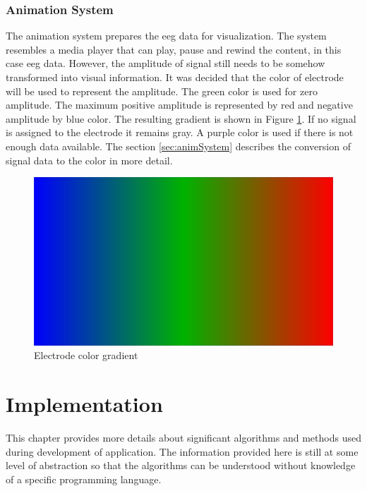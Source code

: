 \subsection{Animation System}
\label{ssec:concAnimSystem}
The animation system prepares the \gls{eeg} data for visualization. The system resembles a media player that can play, pause and rewind the content, in this case \gls{eeg} data. However, the amplitude of signal still needs to be somehow transformed into visual information. It was decided that the color of electrode will be used to represent the amplitude. The green color is used for zero amplitude. The maximum positive amplitude is represented by red and negative amplitude by blue color. The resulting gradient is shown in Figure \ref{fig:ElColorGradient}. If no signal is assigned to the electrode it remains gray. A purple color is used if there is not enough data available. The section \ref{sec:animSystem} describes the conversion of signal data to the color in more detail.

\begin{figure}[htb]
	\centering
	\includegraphics[width=0.8\linewidth, height=0.05\textheight]{fig/gradient.pdf}
	\caption{Electrode color gradient}
	\label{fig:ElColorGradient}
\end{figure}

\chapter{Implementation}
\label{implementation}
This chapter provides more details about significant algorithms and methods used during  development of application. The information provided here is still at some level of abstraction 
so that the algorithms can be understood without knowledge of a specific programming language. 

